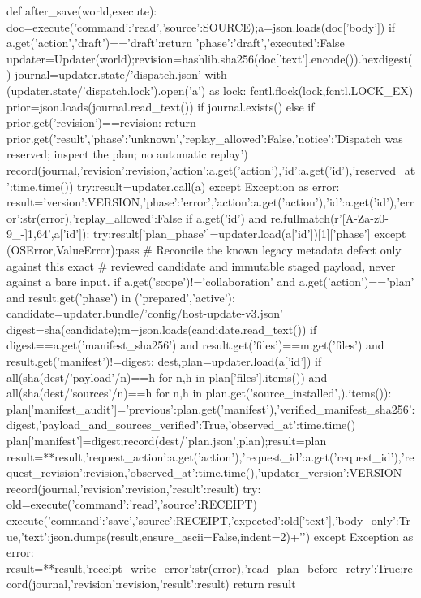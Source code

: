 def after_save(world,execute):
 doc=execute({'command':'read','source':SOURCE});a=json.loads(doc['body'])
 if a.get('action','draft')=='draft':return {'phase':'draft','executed':False}
 updater=Updater(world);revision=hashlib.sha256(doc['text'].encode()).hexdigest()
 journal=updater.state/'dispatch.json'
 with (updater.state/'dispatch.lock').open('a') as lock:
  fcntl.flock(lock,fcntl.LOCK_EX)
  prior=json.loads(journal.read_text()) if journal.exists() else {}
  if prior.get('revision')==revision:
   return prior.get('result',{'phase':'unknown','replay_allowed':False,'notice':'Dispatch was reserved; inspect the plan; no automatic replay'})
  record(journal,{'revision':revision,'action':a.get('action'),'id':a.get('id'),'reserved_at':time.time()})
  try:result=updater.call(a)
  except Exception as error:
   result={'version':VERSION,'phase':'error','action':a.get('action'),'id':a.get('id'),'error':str(error),'replay_allowed':False}
   if a.get('id') and re.fullmatch(r'[A-Za-z0-9_-]{1,64}',a['id']):
    try:result['plan_phase']=updater.load(a['id'])[1]['phase']
    except (OSError,ValueError):pass
  # Reconcile the known legacy metadata defect only against this exact
  # reviewed candidate and immutable staged payload, never against a bare input.
  if a.get('scope')!='collaboration' and a.get('action')=='plan' and result.get('phase') in ('prepared','active'):
   candidate=updater.bundle/'config/host-update-v3.json'
   digest=sha(candidate);m=json.loads(candidate.read_text())
   if digest==a.get('manifest_sha256') and result.get('files')==m.get('files') and result.get('manifest')!=digest:
    dest,plan=updater.load(a['id'])
    if all(sha(dest/'payload'/n)==h for n,h in plan['files'].items()) and all(sha(dest/'sources'/n)==h for n,h in plan.get('source_installed',{}).items()):
     plan['manifest_audit']={'previous':plan.get('manifest'),'verified_manifest_sha256':digest,'payload_and_sources_verified':True,'observed_at':time.time()}
     plan['manifest']=digest;record(dest/'plan.json',plan);result=plan
  result={**result,'request_action':a.get('action'),'request_id':a.get('request_id'),'request_revision':revision,'observed_at':time.time(),'updater_version':VERSION}
  record(journal,{'revision':revision,'result':result})
  try:
   old=execute({'command':'read','source':RECEIPT})
   execute({'command':'save','source':RECEIPT,'expected':old['text'],'body_only':True,'text':json.dumps(result,ensure_ascii=False,indent=2)+'\n'})
  except Exception as error:
   result={**result,'receipt_write_error':str(error),'read_plan_before_retry':True};record(journal,{'revision':revision,'result':result})
  return result


